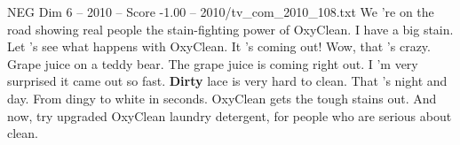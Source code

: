 \begin{textsample}{NEG Dim 6 – 2010 – Score -1.00 – 2010/tv\_com\_2010\_108.txt}  \label{ex:f6_neg_049}
We 're on the road showing real people the stain-fighting power of OxyClean.
I have a big stain.
Let 's see what happens with OxyClean.
It 's coming out!
Wow, that 's crazy.
Grape juice on a teddy bear.
The grape juice is coming right out.
I 'm very surprised it came out so fast. \textbf{Dirty} lace is very hard to clean.
That 's night and day.
From dingy to white in seconds.
OxyClean gets the tough stains out.
And now, try upgraded OxyClean laundry detergent, for people who are serious about clean.

\end{textsample}
